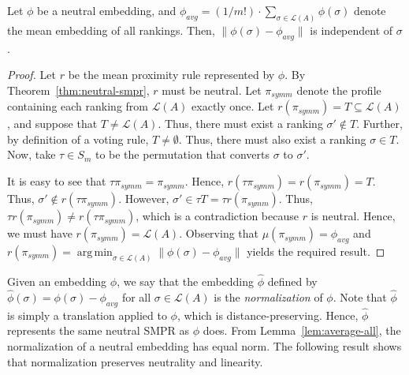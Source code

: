 \documentclass[prodmode]{acmsmall-ec14}
\newcommand{\calL}{{\mathcal{L}}}
\newcommand{\rank}{{\calL(A)}}
\DeclareMathOperator*{\argmin}{arg\,min}
\begin{document}
\begin{lemma}
Let $\phi$ be a neutral embedding, and $\phi_{avg} = (1/m!) \cdot \sum_{\sigma \in \rank} \phi(\sigma)$ denote the mean embedding of all rankings. Then, $\|\phi(\sigma)-\phi_{avg}\|$ is independent of $\sigma$.
\label{lem:average-all}
\end{lemma}
\begin{proof}
Let $r$ be the mean proximity rule represented by $\phi$. By Theorem~\ref{thm:neutral-smpr}, $r$ must be neutral. Let $\pi_{symm}$ denote the profile containing each ranking from $\rank$ exactly once. Let $r(\pi_{symm}) = T \subseteq \rank$, and suppose that $T \neq \rank$. Thus, there must exist a ranking $\sigma' \notin T$. Further, by definition of a voting rule, $T \neq \emptyset$. Thus, there must also exist a ranking $\sigma \in T$. Now, take $\tau \in S_m$ to be the permutation that converts $\sigma$ to $\sigma'$. 

It is easy to see that $\tau \pi_{symm} = \pi_{symm}$. Hence, $r(\tau \pi_{symm}) = r(\pi_{symm}) = T$. Thus, $\sigma' \notin r(\tau \pi_{symm})$. However, $\sigma' \in \tau T = \tau r(\pi_{symm})$. Thus, $\tau r(\pi_{symm}) \neq r(\tau \pi_{symm})$, which is a contradiction because $r$ is neutral. Hence, we must have $r(\pi_{symm}) = \rank$. Observing that $\mu(\pi_{symm}) = \phi_{avg}$ and $r(\pi_{symm}) = \argmin_{\sigma \in \rank} \|\phi(\sigma)-\phi_{avg}\|$ yields the required result.
\end{proof}
%
Given an embedding $\phi$, we say that the embedding $\hat{\phi}$ defined by $\hat{\phi}(\sigma) = \phi(\sigma) - \phi_{avg}$ for all $\sigma \in \rank$ is the \emph{normalization} of $\phi$. Note that $\hat{\phi}$ is simply a translation applied to $\phi$, which is distance-preserving. Hence, $\hat{\phi}$ represents the same neutral SMPR as $\phi$ does. From Lemma~\ref{lem:average-all}, the normalization of a neutral embedding has equal norm. The following result shows that normalization preserves neutrality and linearity.

\end{document}
